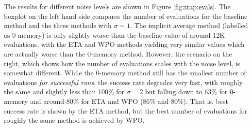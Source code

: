 \documentclass{llncs}
\begin{document}
The results for different noise levels are shown in Figure
\ref{fig:trap:evals}. The boxplot on the left hand side compares the
number of evaluations for the baseline method and the three methods
with  $\sigma=1$. The implicit average method (labelled as 0-memory) is
only slightly worse than the baseline value of around 12K evaluations,
with the ETA and WPO methods yielding very similar values which are
actually worse than the 0-memory method. However, the scenario on the
right,
 which shows how the number of evaluations scales with the noise
level, is somewhat different. 
While the 0-memory method still has the
smallest number of evaluations {\em for successful runs}, the success
rate degrades very fast, with roughly the same and slightly less than
100\% for $\sigma=2$ but falling down to 63\% for 0-memory and around
80\% for ETA and WPO (86\% and 80\%). That is, best success rate is
shown by the ETA method, but the best number of evaluations for
roughly the same method is achieved by WPO. 
\end{document}
